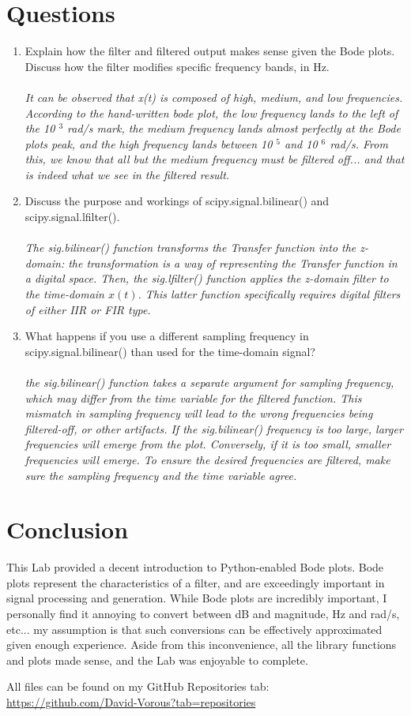 \documentclass[12pt]{report}
\begin{document}
\section{Questions}
\begin{enumerate}
    \item{Explain how the filter and filtered output makes sense given the Bode plots. Discuss how the filter modifies specific frequency bands, in Hz.}\\~\\
    \textit{ It can be observed that x(t) is composed of high, medium, and low frequencies. According to the hand-written bode plot, the low frequency lands to the left of the 10 $^{3}$ rad/s mark, the medium frequency lands almost perfectly at the Bode plots peak, and the high frequency lands between 10 $^{5}$ and 10 $^{6}$ rad/s. From this, we know that all but the medium frequency must be filtered off... and that is indeed what we see in the filtered result.}\\
    \item Discuss the purpose and workings of scipy.signal.bilinear() and scipy.signal.lfilter().\\~\\
    \textit{The sig.bilinear() function transforms the Transfer function into the z-domain: the transformation is a way of representing the Transfer function in a digital space. Then, the sig.lfilter() function applies the z-domain filter to the time-domain $x(t)$. This latter function specifically requires digital filters of either IIR or FIR type.}\\
    \item What happens if you use a different sampling frequency in scipy.signal.bilinear() than used for the time-domain signal?\\~\\
    \textit{the sig.bilinear() function takes a separate argument for sampling frequency, which may differ from the time variable for the filtered function. This mismatch in sampling frequency will lead to the wrong frequencies being filtered-off, or other artifacts. If the sig.bilinear() frequency is too large, larger frequencies will emerge from the plot. Conversely, if it is too small, smaller frequencies will emerge. To ensure the desired frequencies are filtered, make sure the sampling frequency and the time variable agree.}
\end{enumerate}

\pagebreak

\section{Conclusion}
This Lab provided a decent introduction to Python-enabled Bode plots. Bode plots represent the characteristics of a filter, and are exceedingly important in signal processing and generation. While Bode plots are incredibly important, I personally find it annoying to convert between dB and magnitude, Hz and rad/s, etc... my assumption is that such conversions can be effectively approximated given enough experience. Aside from this inconvenience, all the library functions and plots made sense, and the Lab was enjoyable to complete.

All files can be found on my GitHub Repositories tab:\\
\url{https://github.com/David-Vorous?tab=repositories}
\end{document}
